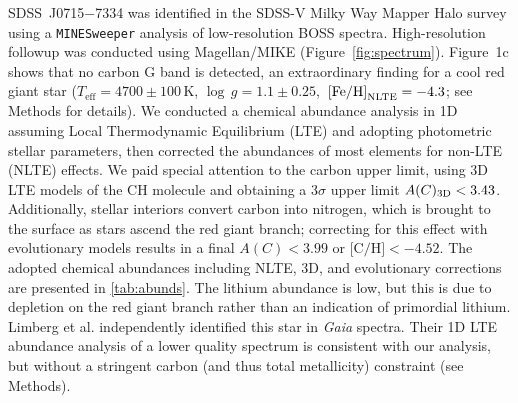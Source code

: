 \documentclass{natureprintstyle}
\newcommand{\code}[1]{\texttt{#1}\xspace}
\newcommand{\unit}[1]{\ensuremath{\mathrm{\,#1}}\xspace}
\newcommand{\feh}{\unit{[Fe/H]}}
\newcommand{\teff}{\ensuremath{T_\mathrm{eff}}\xspace}
\newcommand{\Teff}{\teff}
\newcommand{\logg}{\ensuremath{\log\,g}\xspace}
\newcommand{\umpstar}{J0715$-$7334\xspace}
\begin{document}
SDSS~\umpstar was identified in the SDSS-V\cite{Kollmeier2025} Milky Way Mapper Halo survey using a \code{MINESweeper}\cite{Cargile2020} analysis of low-resolution BOSS spectra\cite{Chandra2025}. High-resolution followup was conducted using Magellan/MIKE\cite{Bernstein2003} (Figure~\ref{fig:spectrum}). 
Figure~1c shows that no carbon G band is detected, an extraordinary finding for a cool red giant star ($\Teff = 4700 \pm 100\,$K, $\logg = 1.1 \pm 0.25$, $\feh_{\rm NLTE} = -4.3$; see Methods for details).
We conducted a chemical abundance analysis in 1D assuming Local Thermodynamic Equilibrium (LTE) and adopting photometric stellar parameters, then corrected the abundances of most elements for non-LTE (NLTE) effects\cite{Gerber2023}. 
We paid special attention to the carbon upper limit, using 3D LTE models of the CH molecule\cite{Eitner2024} and obtaining a $3\sigma$ upper limit $A(C)_{\rm 3D} < 3.43$.
Additionally, stellar interiors convert carbon into nitrogen, which is brought to the surface as stars ascend the red giant branch;
correcting for this effect with evolutionary models\cite{Placco2014} results in a final $A(C) < 3.99$ or $\mbox{[C/H]} < -4.52$.
The adopted chemical abundances including NLTE, 3D, and evolutionary corrections are presented in \ref{tab:abunds}.
The lithium abundance is low, but this is due to depletion on the red giant branch rather than an indication of primordial lithium\cite{Lind2009}.
Limberg et al.\cite{Limberg2025} independently identified this star in \textit{Gaia} spectra. Their 1D LTE abundance analysis of a lower quality spectrum is consistent with our analysis, but without a stringent carbon (and thus total metallicity) constraint (see Methods).
\end{document}
